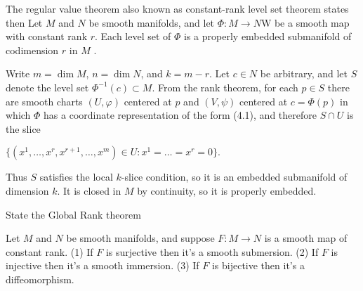 The regular value theorem also known as constant-rank level set theorem states then
Let \( M \) and \( N \) be smooth manifolds, and let \( \Phi : M \to N \)W  be a smooth map with constant rank \( r \). 
Each level set of \( \Phi \) is a properly embedded submanifold of codimension \( r \) in \( M \) .

Write \(m = \dim M\), \(n = \dim N\), and \(k = m - r\). Let \(c \in N\) be arbitrary, and let \(S\) denote the level set \(\Phi^{-1}(c) \subset M\). From the rank theorem, for each \(p \in S\) there are smooth charts \((U, \varphi)\) centered at \(p\) and \((V, \psi)\) centered at \(c = \Phi(p)\) in which \(\Phi\) has a coordinate representation of the form (4.1), and therefore \(S \cap U\) is the slice   
 
\(\{(x^1, \dots, x^r, x^{r+1}, \dots, x^m) \in U : x^1 = \dots = x^r = 0\}.\)

Thus \(S\) satisfies the local \(k\)-slice condition, so it is an embedded submanifold of dimension \(k\). It is closed in \(M\) by continuity, so it is properly embedded.



State the Global Rank theorem

Let \( M \) and \( N \) be smooth manifolds, and suppose \( F : M \to N \) is a smooth map of constant rank. 
(1) If \( F \) is surjective then it's a smooth submersion. 
(2) If \( F \) is injective then it's a smooth immersion. 
(3) If \( F \) is bijective then it's a diffeomorphism.
